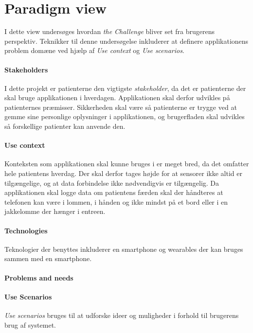 

\section{Paradigm view}
I dette view undersøges hvordan \textit{the Challenge} bliver set fra brugerens perspektiv.
Teknikker til denne undersøgelse inkluderer at definere applikationens problem domæne ved hjælp af \textit{Use context} og \textit{Use scenarios}.

\paragraph{Stakeholders}
I dette projekt er patienterne den vigtigste \textit{stakeholder}, da det er patienterne der skal bruge applikationen i hverdagen.
Applikationen skal derfor udvikles på patienternes præmisser.
Sikkerheden skal være så patienterne er trygge ved at gemme sine personlige oplysninger i applikationen, og brugerfladen skal udvikles så forskellige patienter kan anvende den.

\paragraph{Use context}
Konteksten som applikationen skal kunne bruges i er meget bred, da det omfatter hele patientens hverdag.
Der skal derfor tages højde for at sensorer ikke altid er tilgængelige, og at data forbindelse ikke nødvendigvis er tilgængelig.
Da applikationen skal logge data om patientens færden skal der håndteres at telefonen kan være i lommen, i hånden og ikke mindst på et bord eller i en jakkelomme der hænger i entreen.

\paragraph{Technologies}
Teknologier der benyttes inkluderer en smartphone og wearables der kan bruges sammen med en smartphone.

\paragraph{Problems and needs}

\paragraph{Use Scenarios}
\textit{Use scenarios} bruges til at udforske ideer og muligheder i forhold til brugerens brug af systemet.

